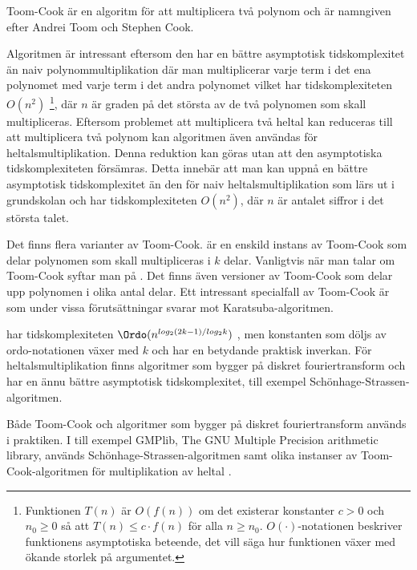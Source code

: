 Toom-Cook är en algoritm för att multiplicera två polynom och är namngiven efter
Andrei Toom och Stephen Cook.

Algoritmen är intressant eftersom den har en bättre asymptotisk tidskomplexitet
än naiv polynommultiplikation där man multiplicerar varje term i det ena
polynomet med varje term i det andra polynomet vilket har tidskomplexiteten
$O\left(n^2\right)$ \footnote{Funktionen $T(n)$ är $O(f(n))$ om det existerar
konstanter $c > 0$ och $n_0 \geq 0$ så att $T(n) \leq c \cdot f(n)$ för alla $n
\geq n_0$. $O(\cdot )$-notationen beskriver funktionens asymptotiska beteende,
det vill säga hur funktionen växer med ökande storlek på argumentet.}, där $n$
är graden på det största av de två polynomen som skall multipliceras. Eftersom
problemet att multiplicera två heltal kan reduceras till att multiplicera två
polynom kan algoritmen även användas för heltalsmultiplikation. Denna reduktion
kan göras utan att den asymptotiska tidskomplexiteten försämras. Detta innebär
att man kan uppnå en bättre asymptotisk tidskomplexitet än den för naiv
heltalsmultiplikation som lärs ut i grundskolan och har tidskomplexiteten
$O\left(n^2\right)$, där $n$ är antalet siffror i det största talet.

Det finns flera varianter av Toom-Cook.  är en enskild instans av
Toom-Cook som delar polynomen som skall multipliceras i $k$ delar. Vanligtvis när
man talar om Toom-Cook syftar man på . Det finns även versioner av
Toom-Cook som delar upp polynomen i olika antal delar. Ett intressant specialfall
av Toom-Cook är  som under vissa förutsättningar svarar mot
Karatsuba-algoritmen.

 har tidskomplexiteten $\Ordo(n^{log_2(2 k-1)/log_2 k})$
\cite{bodrato2007towards}, men konstanten som döljs av ordo-notationen växer
med $k$ och har en betydande praktisk inverkan. För heltalsmultiplikation
finns algoritmer som bygger på diskret fouriertransform och har en ännu bättre
asymptotisk tidskomplexitet, till exempel Schönhage-Strassen-algoritmen.

Både Toom-Cook och algoritmer som bygger på diskret fouriertransform används i
praktiken. I till exempel GMPlib, The GNU Multiple Precision arithmetic
library, används Schönhage-Strassen-algoritmen samt olika instanser av
Toom-Cook-algoritmen för multiplikation av heltal \cite{gmpdoc}.
